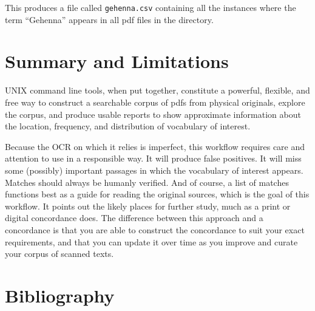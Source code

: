 \documentclass[
  letterpaper,
]{tufte-handout}
\begin{document}
This produces a file called \texttt{gehenna.csv} containing all the
instances where the term ``Gehenna'' appears in all pdf files in the
directory.

\section{Summary and Limitations}\label{summary-and-limitations}

UNIX command line tools, when put together, constitute a powerful,
flexible, and free way to construct a searchable corpus of pdfs from
physical originals, explore the corpus, and produce usable reports to
show approximate information about the location, frequency, and
distribution of vocabulary of interest.

Because the OCR on which it relies is imperfect, this workflow requires
care and attention to use in a responsible way. It will produce false
positives. It will miss some (possibly) important passages in which the
vocabulary of interest appears. Matches should always be humanly
verified. And of course, a list of matches functions best as a guide for
reading the original sources, which is the goal of this workflow. It
points out the likely places for further study, much as a print or
digital concordance does. The difference between this approach and a
concordance is that you are able to construct the concordance to suit
your exact requirements, and that you can update it over time as you
improve and curate your corpus of scanned texts.

\clearpage

\section*{Bibliography}\label{bibliography}
\end{document}
